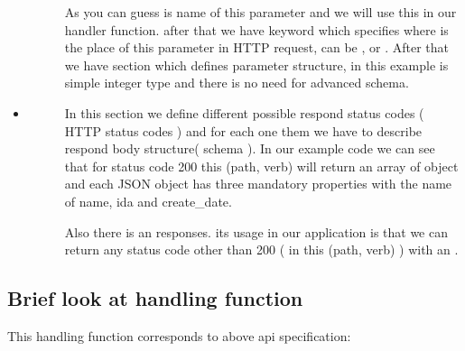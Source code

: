 \documentclass[letterpaper,10pt,english]{sphinxmanual}
\begin{document}
\begin{itemize}
\begin{description}
\begin{sphinxVerbatim}[commandchars=\\\{\}]
   
   
   
     
\end{sphinxVerbatim}

As you can guess  is name of this parameter and we will use this in our handler function.
after that we have  keyword which specifies where is the place of this parameter
in HTTP request,  can be ,  or .
After that we have  section which defines parameter structure, in this example  is simple integer type and
there is no need for advanced schema.

\end{description}

\item {} \begin{description}
\item[{}] \leavevmode
In this section we define different possible respond status codes ( HTTP status codes )
and for each one them we have to describe respond body structure( schema ).
In our example code we can see that for status code 200 this (path, verb) will return
an array of  object and each JSON object has three mandatory properties with the name of name, ida and create\_date.

Also there is an  responses. its usage in our application \sphinxhyphen{}  \sphinxhyphen{}
is that we can return any status code other than 200 ( in this (path, verb) ) with an .

\end{description}

\end{itemize}


\subsection{Brief look at handling function}
\label{\detokenize{RestAPI:brief-look-at-handling-function}}
This handling function corresponds to above api specification:
\end{document}
